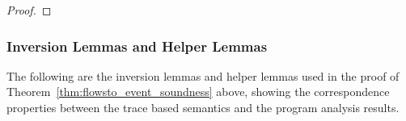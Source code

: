 \begin{proof}
%
\end{proof}

\subsubsection{Inversion Lemmas and Helper Lemmas}
The following are the inversion lemmas and helper lemmas used in the proof of Theorem~\ref{thm:flowsto_event_soundness} above,
showing the correspondence properties between the trace based semantics and the program analysis results.
